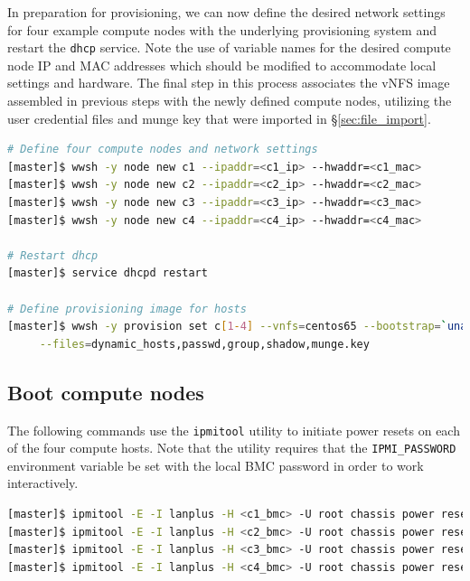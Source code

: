 \documentclass[letterpaper]{article}
\begin{document}
In preparation for provisioning, we can now define the desired network settings
for four example compute nodes with the underlying provisioning system and
restart the \texttt{dhcp} service. Note the use of variable names for the
desired compute node IP and MAC addresses which should be modified to
accommodate local settings and hardware. The final step in this process
associates the vNFS image assembled in previous steps with the newly defined
compute nodes, utilizing the user credential files and munge key that were
imported in \S\ref{sec:file_import}.


\begin{lstlisting}[language=bash,keywords={},upquote=true,basicstyle=\footnotesize\ttfamily]
# Define four compute nodes and network settings 
[master]$ wwsh -y node new c1 --ipaddr=<c1_ip> --hwaddr=<c1_mac> 
[master]$ wwsh -y node new c2 --ipaddr=<c2_ip> --hwaddr=<c2_mac> 
[master]$ wwsh -y node new c3 --ipaddr=<c3_ip> --hwaddr=<c3_mac> 
[master]$ wwsh -y node new c4 --ipaddr=<c4_ip> --hwaddr=<c4_mac> 

# Restart dhcp 
[master]$ service dhcpd restart

# Define provisioning image for hosts
[master]$ wwsh -y provision set c[1-4] --vnfs=centos65 --bootstrap=`uname -r` \
     --files=dynamic_hosts,passwd,group,shadow,munge.key 
\end{lstlisting}


\subsection{Boot compute nodes}

 
The following commands use the \texttt{ipmitool} utility to initiate power
resets on each of the four compute hosts. Note that the utility requires that
the \texttt{IPMI\_PASSWORD} environment variable be set with the local BMC password in
order to work interactively.


\begin{lstlisting}[language=bash,keywords={},upquote=true]
[master]$ ipmitool -E -I lanplus -H <c1_bmc> -U root chassis power reset   # power cycle c1
[master]$ ipmitool -E -I lanplus -H <c2_bmc> -U root chassis power reset   # power cycle c2
[master]$ ipmitool -E -I lanplus -H <c3_bmc> -U root chassis power reset   # power cycle c3
[master]$ ipmitool -E -I lanplus -H <c4_bmc> -U root chassis power reset   # power cycle c4
\end{lstlisting} 
\end{document}
